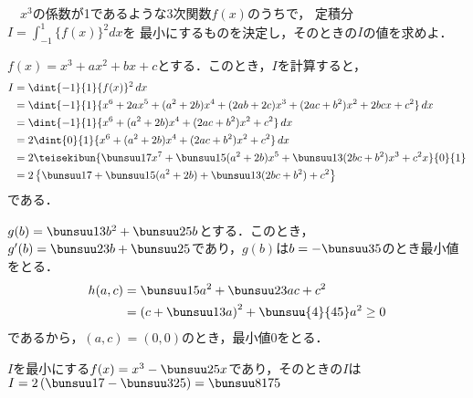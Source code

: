 \begin{problem}
  　$x^3$の係数が1であるような3次関数$f(x)$のうちで，
定積分$\displaystyle I=\int_{-1}^1 {\{ f(x) \}}^2dx$を
最小にするものを決定し，そのときの$I$の値を求めよ．
\end{problem}

$f(x) = x^3 + ax^2 + bx + c$とする．このとき，$I$を計算すると，
\begin{align*}
  I &= \dint{-1}{1}\{f(x)\}^2\,dx\\
  &= \dint{-1}{1}\{x^6 + 2ax^5 + (a^2 + 2b)x^4 + (2ab + 2c)x^3 + (2ac + b^2)x^2 + 2bcx + c^2\}\,dx\\
  &= \dint{-1}{1}\{x^6 + (a^2 + 2b)x^4 + (2ac + b^2)x^2 + c^2\}\,dx\\
  &= 2\dint{0}{1}\{x^6 + (a^2 + 2b)x^4 + (2ac + b^2)x^2 + c^2\}\,dx\\
  &= 2\teisekibun{\bunsuu17x^7 + \bunsuu15(a^2+2b)x^5 + \bunsuu13(2bc + b^2)x^3 + c^2x}{0}{1}\\
  &= 2\left\{\bunsuu17 + \bunsuu15(a^2+2b) + \bunsuu13(2bc + b^2) + c^2\right\}
\end{align*}
である．

$g(b) = \bunsuu13b^2 + \bunsuu25b$とする．このとき，$g'(b) = \bunsuu23b + \bunsuu25$であり，$g(b)$は$b = -\bunsuu35$のとき最小値をとる．
\begin{align*}
  h(a,c) &= \bunsuu15a^2 + \bunsuu23ac + c^2 \\
  &= \left(c + \bunsuu13a\right)^2 + \bunsuu{4}{45}a^2 \geq 0
\end{align*}
であるから，$(a,c) = (0, 0)$のとき，最小値$0$をとる．

$I$を最小にする$f(x) = x^3-\bunsuu25x$であり，そのときの$I$は
$I = 2\left(\bunsuu17 - \bunsuu3{25}\right) = \bunsuu8{175}$

